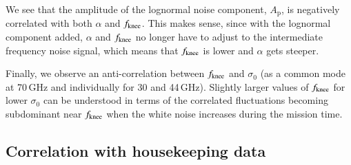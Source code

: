 \documentclass{aa}
\begin{document}
         
        We see that the amplitude of the lognormal noise component, $A_\mathrm{p}$, is negatively correlated with both $\alpha$ and $f_{\rm knee}$. This makes sense, since with the lognormal component added, $\alpha$ and $f_{\rm knee}$ no longer have to adjust to the intermediate frequency noise signal, which means that $f_{\rm knee}$ is lower and $\alpha$ gets steeper. 
        
        
        Finally, we observe an anti-correlation between $f_{\rm knee}$ and $\sigma_0$ (as a common mode at 70\,GHz and individually for 30 and 44\,GHz). Slightly larger values of $f_{\rm knee}$ for lower $\sigma_0$ can be understood in terms of the correlated fluctuations becoming subdominant near $f_{\rm knee}$ when the white noise increases during the mission time.

\subsection{Correlation with housekeeping data}
\end{document}
